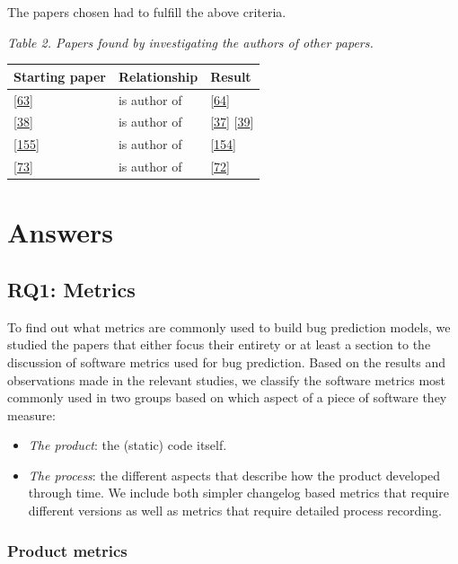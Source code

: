 \documentclass[]{book}
\providecommand{\tightlist}{%
  \setlength{\itemsep}{0pt}\setlength{\parskip}{0pt}}
\begin{document}
The papers chosen had to fulfill the above criteria.

\emph{Table 2. Papers found by investigating the authors of other
papers.}

\begin{longtable}[]{@{}lll@{}}
\toprule
Starting paper & Relationship & Result\tabularnewline
\midrule
\endhead
{[}\protect\hyperlink{ref-DAmbros2010}{63}{]} & is author of &
{[}\protect\hyperlink{ref-DAmbros2012}{64}{]}\tabularnewline
{[}\protect\hyperlink{ref-Catal2009review}{38}{]} & is author of &
{[}\protect\hyperlink{ref-Catal2011}{37}{]}
{[}\protect\hyperlink{ref-Catal2009investigating}{39}{]}\tabularnewline
{[}\protect\hyperlink{ref-rahman2011}{155}{]} & is author of &
{[}\protect\hyperlink{ref-Rahman2013}{154}{]}\tabularnewline
{[}\protect\hyperlink{ref-Giger2011}{73}{]} & is author of &
{[}\protect\hyperlink{ref-giger2012}{72}{]}\tabularnewline
\bottomrule
\end{longtable}

\section{Answers}\label{answers-1}

\subsection{RQ1: Metrics}\label{rq1-metrics}

To find out what metrics are commonly used to build bug prediction
models, we studied the papers that either focus their entirety or at
least a section to the discussion of software metrics used for bug
prediction. Based on the results and observations made in the relevant
studies, we classify the software metrics most commonly used in two
groups based on which aspect of a piece of software they measure:

\begin{itemize}
\tightlist
\item
  \emph{The product}: the (static) code itself.
\item
  \emph{The process}: the different aspects that describe how the
  product developed through time. We include both simpler changelog
  based metrics that require different versions as well as metrics that
  require detailed process recording.
\end{itemize}

\subsubsection{Product metrics}\label{product-metrics}
\end{document}

